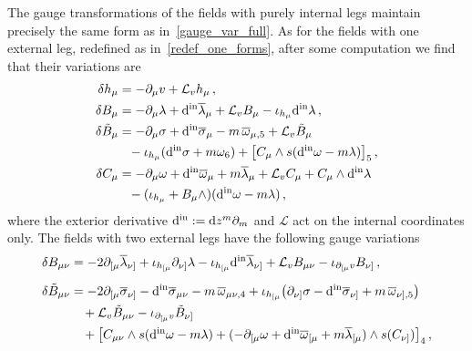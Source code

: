 \documentclass[debug]{phd}
\begin{document}
					The gauge transformations of the fields with purely internal legs maintain precisely the same form as in~\eqref{gauge_var_full}. 
					As for the fields with one external leg, redefined as in~\eqref{redef_one_forms}, after some computation we find that their variations are
							\begin{equation}\label{var_one_ext_index}
								\begin{split}
									\delta h_\mu &= -\partial_\mu v + \mathcal{L}_v h_\mu \, , \\
									\delta B_\mu &= -\partial_\mu \lambda + \din \overline{\lambda}_\mu + \mathcal{L}_v B_\mu - \iota_{h_\mu} \din\lambda\, , \\
									\delta \tilde B_\mu &= -\partial_\mu \sigma + \din{\overline{\sigma}_{\mu}} - m\,\overline{\omega}_{\mu,5} + \mathcal{L}_v \tilde{B}_{\mu} \\
												& \phantom{=} - \iota_{h_\mu}(\din\sigma+m\omega_6) + \left[ C_\mu \wedge s(\din \omega - m\lambda) \right]_5 \, , \\
									\delta C_\mu &= - \partial_\mu \omega + \din \overline{\omega}_\mu + m \overline{\lambda}_\mu + \mathcal{L}_v C_\mu + C_{\mu} \wedge \din \lambda \\
												& \phantom{=} - (\iota_{h_\mu}+ B_\mu \wedge)(\din\omega -m\lambda)\,,
								\end{split}
							\end{equation}
					where the exterior derivative $\mathrm{d^{\text{in}}} := \mathrm{d} z^m \partial_m$ and $\mathcal{L}$ act on the internal coordinates only.
					The fields with two external legs have the following gauge variations
							\begin{equation}\label{transf_2form_BtildeB}
								\begin{split}
									\delta B_{\mu\nu} &= -2 \partial_{[\mu} \overline{\lambda}_{\nu]} +\iota_{h_{[\mu}}\partial_{\nu]} \lambda - \iota_{h_{[\mu}}\mathrm{d^{\text{in}}} \overline{\lambda}_{\nu]} + \mathcal{L}_v B_{\mu\nu} - \iota_{\partial_{[\mu}v} B_{\nu]}\, , \\[2mm]
									\delta \tilde B_{\mu\nu} &= - 2 \partial_{[\mu}\overline{\sigma}_{\nu]} -\mathrm{d^{\text{in}}} \overline{\sigma}_{\mu\nu} -m\, \overline{\omega}_{\mu\nu,4} + \iota_{h_{[\mu}}\big(\partial_{\nu]}\sigma - \mathrm{d^{\text{in}}} \overline{\sigma}_{\nu]} + m \,\overline{\omega}_{\nu],5} \big) \\
														&\phantom{= \, } + \mathcal{L}_v \tilde B_{\mu\nu}- \iota_{\partial_{[\mu}v}\tilde{B}_{\nu]} \\
														&\phantom{= \, } + \big[C_{\mu\nu} \wedge s(\mathrm{d^{\text{in}}}\omega-m\lambda) + ( -\partial_{[\mu}\omega + \mathrm{d^{\text{in}}} \overline{\omega}_{[\mu} + m\overline{\lambda}_{[\mu} ) \wedge s(C_{\nu]}) \big]_4 \, ,
								\end{split}
							\end{equation}
\end{document}
